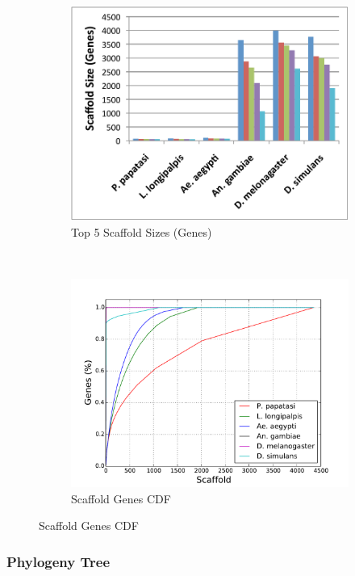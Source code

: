 \begin{figure}[H]
\begin{subfigure}[b]{0.45\textwidth}
    \includegraphics[width=\textwidth]{figures/synteny/top5_scaffold_sizes.pdf}
    \caption{Top 5 Scaffold Sizes (Genes)}
  \end{subfigure}
\label{fig:scaffolds}
  ~
  \begin{subfigure}[b]{0.45\textwidth}
    \includegraphics[width=\textwidth]{figures/synteny/gene_scaffold_cdf.pdf}
    \caption{Scaffold Genes CDF}
  \end{subfigure}
\end{figure}

\subsubsection{Phylogeny Tree}

